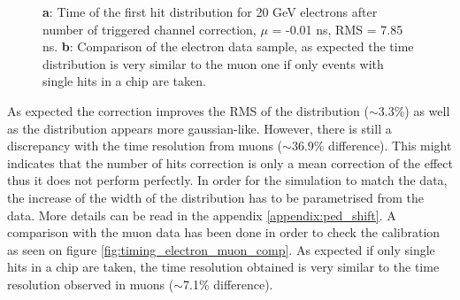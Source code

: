 \documentclass[twoside,a4paper,11pt]{article}
\begin{document}
\begin{figure}[htbp]
	\hfill
	\caption[]{\textbf{a}: Time of the first hit distribution for 20 GeV electrons after number of triggered channel correction, $\mu$ = -0.01 ns, RMS = 7.85 ns. \textbf{b}: Comparison of the electron data sample, as expected the time distribution is very similar to the muon one if only events with single hits in a chip are taken.}
\end{figure}
As expected the correction improves the RMS of the distribution ($\sim$3.3\%) as well as the distribution appears more gaussian-like. However, there is still a discrepancy with the time resolution from muons ($\sim$36.9\% difference). This might indicates that the number of hits correction is only a mean correction of the effect thus it does not perform perfectly. In order for the simulation to match the data, the increase of the width of the distribution has to be parametrised from the data. More details can be read in the appendix \ref{appendix:ped_shift}. A comparison with the muon data has been done in order to check the calibration as seen on figure \ref{fig:timing_electron_muon_comp}. As expected if only single hits in a chip are taken, the time resolution obtained is very similar to the time resolution observed in muons ($\sim$7.1\% difference).
\end{document}
